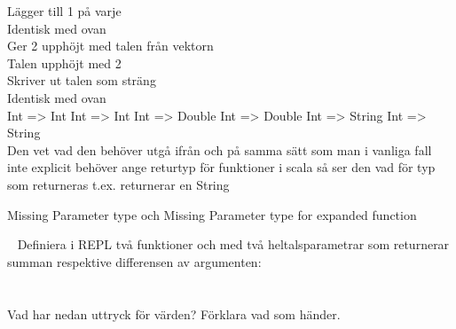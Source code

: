 \SubtaskSolved
{} Lägger till 1 på varje\\
 Identisk med ovan\\
 Ger 2 upphöjt med talen från vektorn\\
 Talen upphöjt med 2\\
 Skriver ut talen som sträng\\
 Identisk med ovan\\

\SubtaskSolved
Int => Int
Int => Int
Int => Double
Int => Double
Int => String
Int => String \\
Den vet vad den behöver utgå ifrån och på samma sätt som man i vanliga fall inte explicit behöver ange returtyp för funktioner i scala så ser den vad för typ som returneras t.ex.  returnerar en String

\SubtaskSolved
Missing Parameter type och Missing Parameter type for expanded function



\QUESTEND




\ExtraTasks %




\QUESTBEGIN

\Task  \what~  Definiera i REPL två funktioner  och  med två heltalsparametrar som returnerar summan respektive differensen av argumenten: \\
 \\
 \\
Vad har nedan uttryck för värden? Förklara vad som händer.

\Subtask {}

\Subtask {}

\Subtask {}

\Subtask {}

\SOLUTION

\TaskSolved \what

\SubtaskSolved  {}

\SubtaskSolved  {}

\SubtaskSolved  {}

